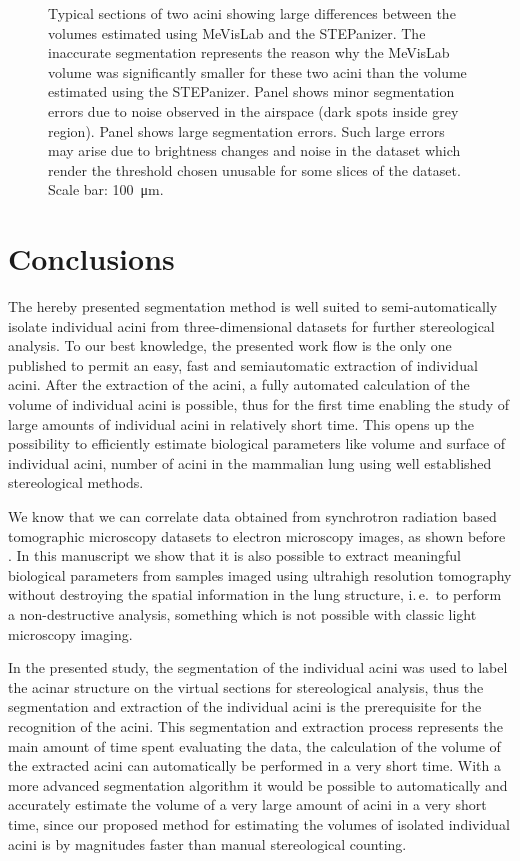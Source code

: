 \documentclass[a4paper,DIV=calc,abstract,english]{scrartcl}
\newcommand{\ie}{i.\,e.\ }
\begin{document}
\begin{figure}
{		\label{subfig:60e_acinus38}%
	}%
	\hfill%
	\caption{Typical sections of two acini showing large differences between the volumes estimated using MeVisLab and the STEPanizer.
		The inaccurate segmentation represents the reason why the MeVisLab volume was significantly smaller for these two acini than the volume estimated using the STEPanizer.
		Panel \protect{} shows minor segmentation errors due to noise observed in the airspace (dark spots inside grey region).
		Panel \protect{} shows large segmentation errors.
		Such large errors may arise due to brightness changes and noise in the dataset which render the threshold chosen unusable for some slices of the dataset.
		Scale bar: \SI{100}{\micro\meter}.}
	\label{fig:MeVisSegmentation}
\end{figure}

\section{Conclusions}
The hereby presented segmentation method is well suited to semi-automatically isolate individual acini from three-dimensional datasets for further stereological analysis.
To our best knowledge, the presented work flow is the only one published to permit an easy, fast and semiautomatic extraction of individual acini.
After the extraction of the acini, a fully automated calculation of the volume of individual acini is possible, thus for the first time enabling the study of large amounts of individual acini in relatively short time.
This opens up the possibility to efficiently estimate biological parameters like volume and surface of individual acini, number of acini in the mammalian lung using well established stereological methods.

We know that we can correlate data obtained from synchrotron radiation based tomographic microscopy datasets to electron microscopy images, as shown before \citep{Haberthuer2009}.
In this manuscript we show that it is also possible to extract meaningful biological parameters from samples imaged using ultrahigh resolution tomography without destroying the spatial information in the lung structure, \ie to perform a non-destructive analysis, something which is not possible with classic light microscopy imaging.

In the presented study, the segmentation of the individual acini was used to label the acinar structure on the virtual sections for stereological analysis, thus the segmentation and extraction of the individual acini is the prerequisite for the recognition of the acini.
This segmentation and extraction process represents the main amount of time spent evaluating the data, the calculation of the volume of the extracted acini can automatically be performed in a very short time.
With a more advanced segmentation algorithm it would be possible to automatically and accurately estimate the volume of a very large amount of acini in a very short time, since our proposed method for estimating the volumes of isolated individual acini is by magnitudes faster than manual stereological counting.
\end{document}
